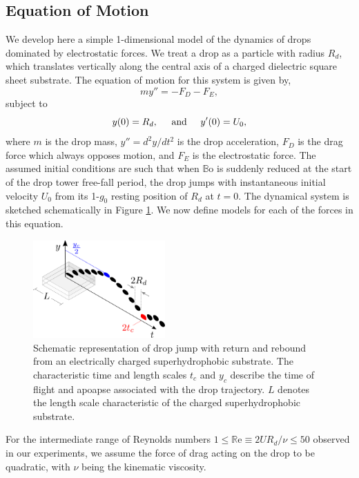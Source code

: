 \documentclass[aip,reprint, floatfix]{revtex4-1}
\begin{document}
\subsection{Equation of Motion}
We develop here a simple 1-dimensional model of the dynamics of drops dominated by electrostatic forces. We treat a drop as a particle with radius $R_d$, which translates vertically along the central axis of a charged dielectric square sheet substrate. The equation of motion for this system is given by,
\begin{equation}
m y'' = - F_D - F_E,
\label{gov_eqn}
\end{equation}
subject to
\begin{equation}
y(0) = R_d, \hspace{5 mm} \mbox{and} \hspace{5 mm} y'(0) = U_0,
\end{equation}
where $m$ is the drop mass, $y'' = d^2 y/d t^2$ is the drop acceleration, $F_D$ is the drag force which always opposes motion, and $F_E$ is the electrostatic force. The assumed initial conditions are such that when $\mathbb{B}\mbox{o}$ is suddenly reduced at the start of the drop tower free-fall period, the drop jumps with instantaneous initial velocity $U_0$ from its 1-$g_0$ resting position of $R_d$ at $t=0$. The dynamical system is sketched schematically in Figure \ref{fig:apparatus}. We now define models for each of the forces in this equation.

\begin{figure}[ht]
\centering
\includegraphics[width=0.45\textwidth]{../figures/apparatus3.pdf}
\caption{Schematic representation of drop jump with return and rebound from an electrically charged superhydrophobic substrate. The characteristic time and length scales $t_c$ and $y_c$ describe the time of flight and apoapse associated with the drop trajectory. $L$ denotes the length scale characteristic of the charged superhydrophobic substrate.}
\label{fig:apparatus}
\end{figure}

For the intermediate range of Reynolds numbers $1 \leq \mathbb{R}\mbox{e} \equiv 2UR_d / \nu \leq 50 $ observed in our experiments, we assume the force of drag acting on the drop to be quadratic, with $\nu$ being the kinematic viscosity.
\end{document}
